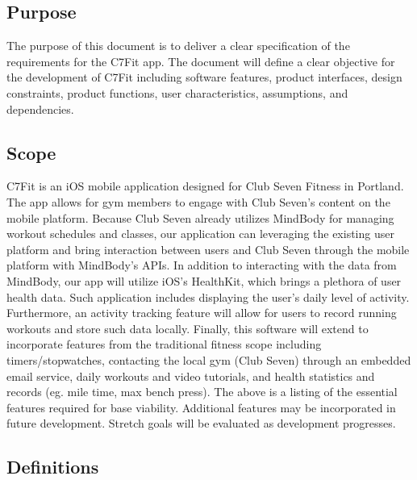 \documentclass[letterpaper,10pt,titlepage]{article}
\begin{document}
\subsection{Purpose}

The purpose of this document is to deliver a clear specification of the requirements for the C7Fit app. The document will define a clear objective for the development of C7Fit including software features, product interfaces, design constraints, product functions, user characteristics, assumptions, and dependencies.

\subsection{Scope}

C7Fit is an iOS mobile application designed for Club Seven Fitness in Portland. The app allows for gym members to engage with Club Seven's content on the mobile platform. Because Club Seven already utilizes MindBody for managing workout schedules and classes, our application can leveraging the existing user platform and bring interaction between users and Club Seven through the mobile platform with MindBody's APIs. In addition to interacting with the data from MindBody, our app will utilize iOS's HealthKit, which brings a plethora of user health data.  Such application includes displaying the user's daily level of activity. Furthermore, an activity tracking feature will allow for users to record running workouts and store such data locally. Finally, this software will extend to incorporate features from the traditional fitness scope including timers/stopwatches, contacting the local gym (Club Seven) through an embedded email service, daily workouts and video tutorials, and health statistics and records (eg. mile time, max bench press). The above is a listing of the essential features required for base viability. Additional features may be incorporated in future development. Stretch goals will be evaluated as development progresses.

\subsection{Definitions}
\end{document}

